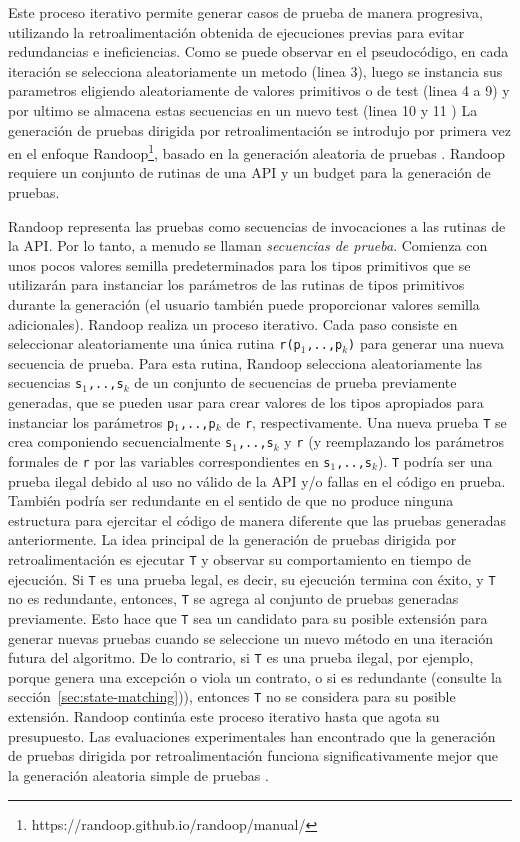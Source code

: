 Este proceso iterativo permite generar casos de prueba de manera progresiva, 
utilizando la retroalimentación obtenida de ejecuciones previas para evitar redundancias e ineficiencias.
Como se puede observar en el pseudocódigo, en cada iteración se selecciona aleatoriamente un metodo (linea 3), luego se instancia sus parametros eligiendo aleatoriamente de valores primitivos
o de test (linea 4 a 9) y por ultimo se almacena estas secuencias en un nuevo test (linea 10 y 11 ) 
La generación de pruebas dirigida por retroalimentación se introdujo por primera vez en el enfoque \textsf{Randoop}\footnote{https://randoop.github.io/randoop/manual/}, basado en la generación aleatoria de pruebas \cite{Pacheco07}. \textsf{Randoop} requiere un conjunto de rutinas de una API y un budget para la generación de pruebas.

\textsf{Randoop} representa las pruebas como secuencias de invocaciones a las rutinas de la API. Por lo tanto, a menudo se llaman \emph{secuencias de prueba}. Comienza con unos pocos valores semilla predeterminados para los tipos primitivos que se utilizarán para instanciar los parámetros de las rutinas de tipos primitivos durante la generación (el usuario también puede proporcionar valores semilla adicionales). \textsf{Randoop} realiza un proceso iterativo. Cada paso consiste en seleccionar aleatoriamente una única rutina \texttt{r(p$_1$,..,p$_k$)} para generar una nueva secuencia de prueba. Para esta rutina, \textsf{Randoop} selecciona aleatoriamente las secuencias \texttt{s$_1$,..,s$_k$} de un conjunto de secuencias de prueba previamente generadas, que se pueden usar para crear valores de los tipos apropiados para instanciar los parámetros \texttt{p$_1$,..,p$_k$} de \texttt{r}, respectivamente. Una nueva prueba \texttt{T} se crea componiendo secuencialmente \texttt{s$_1$,..,s$_k$} y \texttt{r} (y reemplazando los parámetros formales de \texttt{r} por las variables correspondientes en \texttt{s$_1$,..,s$_k$}). \texttt{T} podría ser una prueba ilegal debido al uso no válido de la API y/o fallas en el código en prueba. También podría ser redundante en el sentido de que no produce ninguna estructura para ejercitar el código de manera diferente que las pruebas generadas anteriormente.
La idea principal de la generación de pruebas dirigida por retroalimentación es ejecutar \texttt{T} y observar su comportamiento en tiempo de ejecución. Si \texttt{T} es una prueba legal, es decir, su ejecución termina con éxito,
y \texttt{T} no es redundante, entonces, \texttt{T} se agrega al conjunto de pruebas generadas previamente. Esto hace que \texttt{T} sea un candidato para su posible extensión para generar nuevas pruebas cuando se seleccione un nuevo método en una iteración futura del algoritmo. De lo contrario, si \texttt{T} es una prueba ilegal, por ejemplo, porque genera una excepción o viola un contrato, o si es redundante (consulte la sección~\ref{sec:state-matching})), entonces \texttt{T} no se considera para su posible extensión. \textsf{Randoop} continúa este proceso iterativo hasta que agota su presupuesto. Las evaluaciones experimentales han encontrado que la generación de pruebas dirigida por retroalimentación funciona significativamente mejor que la generación aleatoria simple de pruebas \cite{Pacheco07,Pacheco08}.
